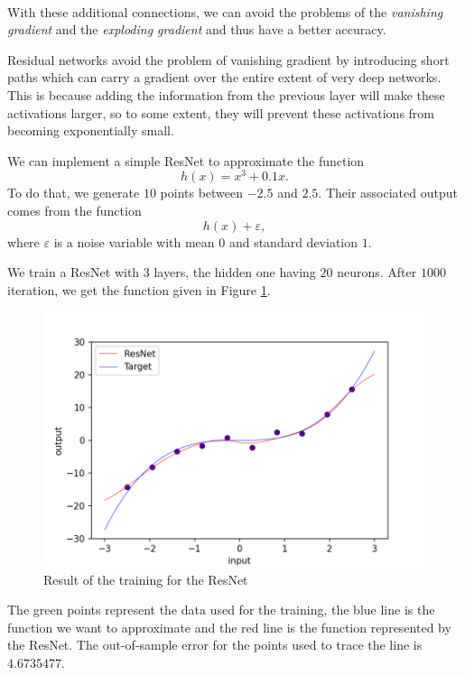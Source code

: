 \documentclass[10pt,a4paper]{article}
\theoremstyle{definition}
\theoremstyle{definition}
\theoremstyle{definition}
\begin{document}
~

With these additional connections, we can avoid the problems of the \textit{vanishing gradient} and the \textit{exploding gradient} and thus have a better accuracy. 



Residual networks avoid the problem of vanishing gradient by introducing short paths which can carry a gradient over the entire extent of very deep networks. This is because adding the information from the previous layer will make these activations larger, so to some extent, they will prevent these activations from becoming exponentially small.

We can implement a simple ResNet to approximate the function
$$
h(x) = x^3 + 0.1x.
$$
To do that, we generate $10$ points between $-2.5$ and $2.5$. Their associated output comes from the function
$$
h(x) + \varepsilon,
$$
where $\varepsilon$ is a noise variable with mean $0$ and standard deviation $1$.

We train a ResNet with $3$ layers, the hidden one having $20$ neurons. After $1000$ iteration, we get the function given in Figure \ref{example_resnet}.

\begin{figure}[!h]
\center
\includegraphics[scale=0.4]{ex_resnet.png}
\caption{Result of the training for the ResNet}
\label{example_resnet}
\end{figure}

The green points represent the data used for the training, the blue line is the function we want to approximate and the red line is the function represented by the ResNet. The out-of-sample error for the points used to trace the line is $4.6735477$.
\end{document}
